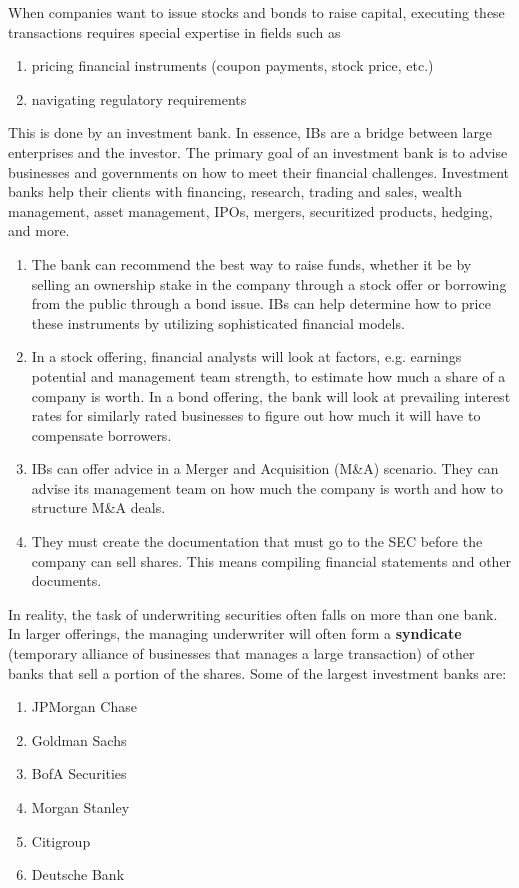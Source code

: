\documentclass{article}
\begin{document}
    \begin{definition}
    When companies want to issue stocks and bonds to raise capital, executing these transactions requires special expertise in fields such as
    \begin{enumerate}
        \item pricing financial instruments (coupon payments, stock price, etc.) 
        \item navigating regulatory requirements
    \end{enumerate}
    This is done by an investment bank. In essence, IBs are a bridge between large enterprises and the investor. The primary goal of an investment bank is to advise businesses and governments on how to meet their financial challenges. Investment banks help their clients with financing, research, trading and sales, wealth management, asset management, IPOs, mergers, securitized products, hedging, and more.
    \begin{enumerate}
        \item The bank can recommend the best way to raise funds, whether it be by selling an ownership stake in the company through a stock offer or borrowing from the public through a bond issue. IBs can help determine how to price these instruments by utilizing sophisticated financial models. 
        \item In a stock offering, financial analysts will look at factors, e.g. earnings potential and management team strength, to estimate how much a share of a company is worth. In a bond offering, the bank will look at prevailing interest rates for similarly rated businesses to figure out how much it will have to compensate borrowers. 
        \item IBs can offer advice in a Merger and Acquisition (M\&A) scenario. They can advise its management team on how much the company is worth and how to structure M\&A deals. 
        \item They must create the documentation that must go to the SEC before the company can sell shares. This means compiling financial statements and other documents. 
    \end{enumerate}
    In reality, the task of underwriting securities often falls on more than one bank. In larger offerings, the managing underwriter will often form a \textbf{syndicate} (temporary alliance of businesses that manages a large transaction) of other banks that sell a portion of the shares. Some of the largest investment banks are: 
    \begin{enumerate}
      \item JPMorgan Chase 
      \item Goldman Sachs 
      \item BofA Securities 
      \item Morgan Stanley
      \item Citigroup 
      \item Deutsche Bank 
    \end{enumerate}
    \end{definition}
\end{document}

